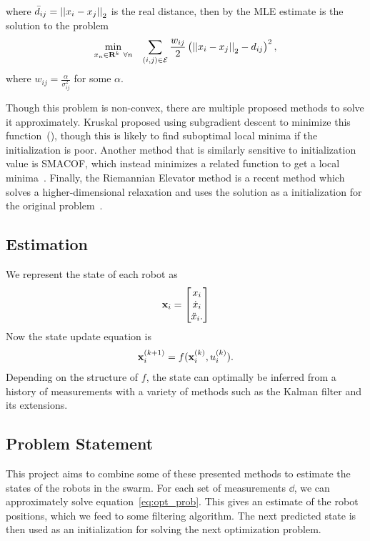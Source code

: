 \documentclass{IEEEtran}
\begin{document}
where $\bar{d}_{ij} = \left|\left|x_i - x_j\right|\right|_2$ is the real distance, then by \cite{R_elevator} the MLE estimate is the solution to the problem
\begin{align}
    \label{eq:opt_prob}
    \min_{\x[n] \in \mathbf{R}^k \ \forall n} && 
    \sum_{(i,j) \in \mathcal{E}} \frac{w_{ij}}{2} \left(\norm{\x - \x[j]}_2 - \dd \right)^2,
\end{align}
where $w_{ij}=\frac{\alpha}{\sigma_{ij}^2}$ for some $\alpha$.

Though this problem is non-convex, there are multiple proposed methods to solve it approximately. Kruskal proposed using subgradient descent to minimize this function~(\cite{Kruskal1964}), though this is likely to find suboptimal local minima if the initialization is poor. Another method that is similarly sensitive to initialization value is SMACOF, which instead minimizes a related function to get a local minima~\cite{de2005applications}. Finally, the Riemannian Elevator method is a recent method which solves a higher-dimensional relaxation and uses the solution as a initialization for the original problem~\cite{R_elevator}. 

\subsection{Estimation}
We represent the state of each robot as
\begin{align}
    \mathbf{x}_{i} = \begin{bmatrix}
        x_{i} \\ \dot{x}_{i} \\ \ddot{x}_{i}.
    \end{bmatrix}
\end{align}
Now the state update equation is 
\begin{align}
    \mathbf{x}_{i}^{(k+1)} = f(\mathbf{x}_{i}^{(k)}, u_i^{(k)}).
\end{align}
Depending on the structure of $f$, the state can optimally be inferred from a history of measurements with a variety of methods such as the Kalman filter and its extensions.

\subsection{Problem Statement}
This project aims to combine some of these presented methods to estimate the states of the robots in the swarm. For each set of measurements $\dd$, we can approximately solve equation~\ref{eq:opt_prob}. This gives an estimate of the robot positions, which we feed to some filtering algorithm. The next predicted state is then used as an initialization for solving the next optimization problem. 

\printbibliography
\end{document}

